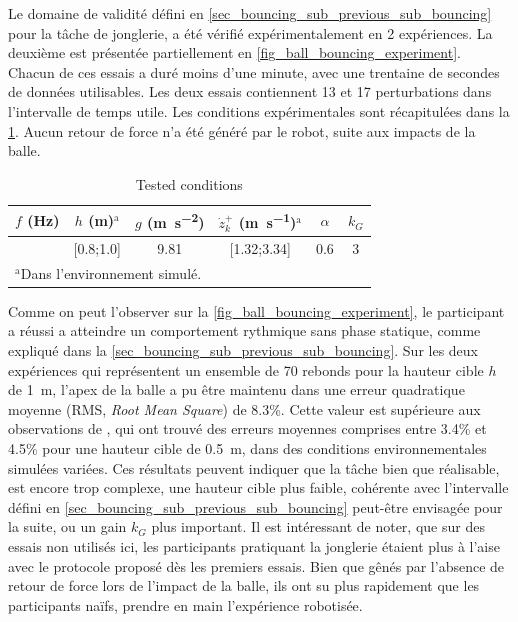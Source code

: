 \documentclass[12pt, a4paper]{article} %
\numberwithin{equation}{section}
\begin{document}
Le domaine de validité défini en \cref{sec_bouncing_sub_previous_sub_bouncing} pour la tâche de jonglerie, a été vérifié expérimentalement en 2 expériences. La deuxième est présentée partiellement en \cref{fig_ball_bouncing_experiment}. Chacun de ces essais a duré moins d'une minute, avec une trentaine de secondes de données utilisables. Les deux essais contiennent 13 et 17 perturbations dans l'intervalle de temps utile. Les conditions expérimentales sont récapitulées dans la \cref{tab_task_constraints}. Aucun retour de force n'a été généré par le robot, suite aux impacts de la balle.
%
\begin{table}[htbp] 
	\begin{center}
		\begin{tabular}{c|c|c|c|c|c}
			$f$ (\si{\hertz}) & $h$ (\si{\metre})$^{\mathrm{a}}$ & $g$ (\si{\metre\per\second\squared}) & $\dot{z}_k^+$ (\si{\metre\per\second})$^{\mathrm{a}}$ & $\alpha$ & $ k_G $ \\
			\hline
			[0.9;1.7] & [0.8;1.0] & 9.81 & [1.32;3.34] & 0.6 & 3 \\
			\multicolumn{4}{l}{$^{\mathrm{a}}$Dans l'environnement simulé.}
		\end{tabular}
	\end{center}
	\caption{Tested conditions} %
	\label{tab_task_constraints}	
\end{table}
%

Comme on peut l'observer sur la \cref{fig_ball_bouncing_experiment}, le participant a réussi a atteindre un comportement rythmique sans phase statique, comme expliqué dans la \cref{sec_bouncing_sub_previous_sub_bouncing}. Sur les deux expériences qui représentent un ensemble de 70 rebonds pour la hauteur cible $ h $ de \SI{1}{\metre}, l'apex de la balle a pu être maintenu dans une erreur quadratique moyenne (RMS, \textit{Root Mean Square}) de 8.3\%. Cette valeur est supérieure aux observations de \cite{siegler_passive_2010}, qui ont trouvé des erreurs moyennes comprises entre 3.4\% et 4.5\% pour une hauteur cible de \SI{0.5}{\metre}, dans des conditions environnementales simulées variées. Ces résultats peuvent indiquer que la tâche bien que réalisable, est encore trop complexe, une hauteur cible plus faible, cohérente avec l'intervalle défini en  \cref{sec_bouncing_sub_previous_sub_bouncing} peut-être envisagée pour la suite, ou un gain $ k_G $ plus important.
%
\newlineBlank
% 
Il est intéressant de noter, que sur des essais non utilisés ici, les participants pratiquant la jonglerie étaient plus à l'aise avec le protocole proposé dès les premiers essais. Bien que gênés par l'absence de retour de force lors de l'impact de la balle, ils ont su plus rapidement que les participants naïfs, prendre en main l'expérience robotisée.
%

\end{document}
